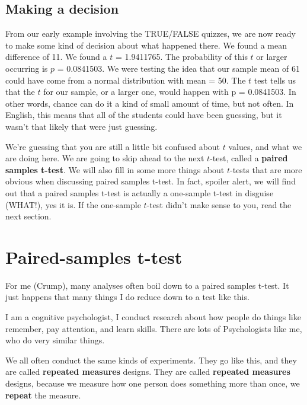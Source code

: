 \documentclass[]{book}
\begin{document}
\hypertarget{making-a-decision}{%
\subsection{Making a decision}\label{making-a-decision}}

From our early example involving the TRUE/FALSE quizzes, we are now ready to make some kind of decision about what happened there. We found a mean difference of 11. We found a \(t\) = 1.9411765. The probability of this \(t\) or larger occurring is \(p\) = 0.0841503. We were testing the idea that our sample mean of 61 could have come from a normal distribution with mean = 50. The \(t\) test tells us that the \(t\) for our sample, or a larger one, would happen with p = 0.0841503. In other words, chance can do it a kind of small amount of time, but not often. In English, this means that all of the students could have been guessing, but it wasn't that likely that were just guessing.

We're guessing that you are still a little bit confused about \(t\) values, and what we are doing here. We are going to skip ahead to the next \(t\)-test, called a \textbf{paired samples t-test}. We will also fill in some more things about \(t\)-tests that are more obvious when discussing paired samples t-test. In fact, spoiler alert, we will find out that a paired samples t-test is actually a one-sample t-test in disguise (WHAT!), yes it is. If the one-sample \(t\)-test didn't make sense to you, read the next section.

\hypertarget{paired-samples-t-test}{%
\section{Paired-samples t-test}\label{paired-samples-t-test}}

For me (Crump), many analyses often boil down to a paired samples t-test. It just happens that many things I do reduce down to a test like this.

I am a cognitive psychologist, I conduct research about how people do things like remember, pay attention, and learn skills. There are lots of Psychologists like me, who do very similar things.

We all often conduct the same kinds of experiments. They go like this, and they are called \textbf{repeated measures} designs. They are called \textbf{repeated measures} designs, because we measure how one person does something more than once, we \textbf{repeat} the measure.
\end{document}

